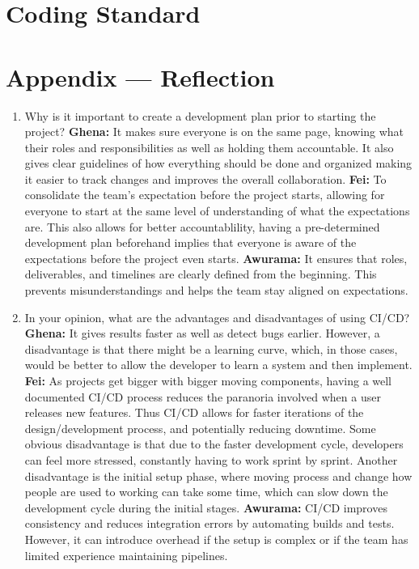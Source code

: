 \documentclass{article}
\begin{document}

\section{Coding Standard}


\newpage{}

\section*{Appendix --- Reflection}



\begin{enumerate}
    \item Why is it important to create a development plan prior to starting the
    project?
    \textbf{Ghena: } It makes sure everyone is on the same page, knowing what their roles and responsibilities as well as holding them accountable. It also gives clear guidelines of how everything should be done and organized making it easier to track changes and improves the overall collaboration.
    \textbf{Fei:} To consolidate the team’s expectation before the project starts, allowing for everyone to start at the same level of understanding of what the expectations are. This also allows for better accountablility, having a pre-determined development plan beforehand implies that everyone is aware of the expectations before the project even starts.
    \textbf{Awurama:} It ensures that roles, deliverables, and timelines are clearly defined 
    from the beginning. This prevents misunderstandings and helps the team stay aligned 
    on expectations.

    \item In your opinion, what are the advantages and disadvantages of using
    CI/CD?
      \textbf{Ghena:} It gives results faster as well as detect bugs earlier. However, a disadvantage is that there might be a learning curve, which, in those cases, would be better to allow the developer to learn a system and then implement. 
      \textbf{Fei:} As projects get bigger with bigger moving components, having a well documented CI/CD process reduces the paranoria involved when a user releases new features. Thus CI/CD allows for faster iterations of the design/development process, and potentially reducing downtime. Some obvious disadvantage is that due to the faster development cycle, developers can feel more stressed, constantly having to work sprint by sprint. Another disadvantage is the initial setup phase, where moving process and change how people are used to working can take some time, which can slow down the development cycle during the initial stages.
     \textbf{Awurama:} CI/CD improves consistency and reduces integration errors by 
    automating builds and tests. However, it can introduce overhead if the setup is 
    complex or if the team has limited experience maintaining pipelines.  


\end{enumerate}
\end{document}
